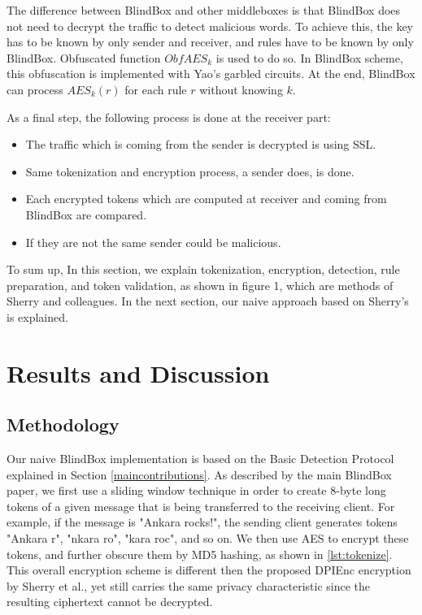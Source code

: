 \documentclass{winslabreport}
\begin{document}
The difference between BlindBox and other middleboxes is that BlindBox does not need to decrypt the traffic to detect malicious words. To achieve this, the key has to be known by only sender and receiver, and rules have to be known by only BlindBox. Obfuscated function $ObfAES_k$  is used to do so. In BlindBox scheme, this obfuscation is implemented with Yao's\cite{chi,chii} garbled circuits. At the end, BlindBox can process $AES_k(r)$ for each rule $r$ without knowing $k$. 

As a final step, the following process is done  at the receiver part:
\begin{itemize}
    \item The traffic which is coming from the sender is decrypted is using SSL.
    \item Same tokenization and encryption process, a sender does, is done.
    \item Each encrypted tokens which are computed at receiver and coming from BlindBox are compared. 
    \item If they are not the same sender could be malicious.
\end{itemize}

To sum up, In this section, we explain tokenization, encryption, detection, rule preparation, and token validation, as shown in figure 1, which are methods of Sherry \cite{BlindBox} and colleagues. In the next section, our naive approach based on Sherry's is explained.

\section{Results and Discussion}

\subsection{Methodology} \label{methodology}

Our naive BlindBox implementation is based on the Basic Detection Protocol explained in Section \ref{maincontributions}. As described by the main BlindBox paper, we first use a sliding window technique in order to create 8-byte long tokens of a given message that is being transferred to the receiving client. For example, if the message is "Ankara rocks!", the sending client generates tokens "Ankara r", "nkara ro", "kara roc", and so on. We then use AES to encrypt these tokens, and further obscure them by MD5 hashing, as shown in \autoref{lst:tokenize}. This overall encryption scheme is different then the proposed DPIEnc encryption by Sherry et al., yet still carries the same privacy characteristic since the resulting ciphertext cannot be decrypted.
\end{document}

